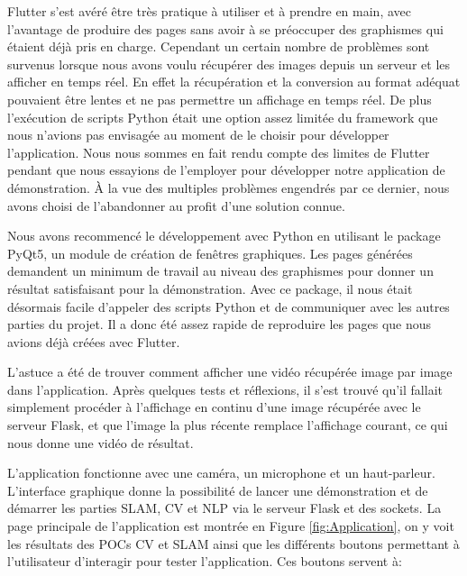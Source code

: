 \documentclass[11pt]{article}
\begin{document}
        Flutter s'est avéré être très pratique à utiliser et à prendre en main, avec l'avantage de produire des pages sans avoir à se préoccuper 
        des graphismes qui étaient déjà pris en charge. Cependant un certain nombre de problèmes sont survenus lorsque nous avons voulu récupérer 
        des images depuis un serveur et les afficher en temps réel. En effet la récupération et la conversion au format adéquat pouvaient être lentes
        et ne pas permettre un affichage en temps réel. De plus l'exécution de scripts Python était une option assez limitée du framework que nous 
        n'avions pas envisagée au moment de le choisir pour développer l'application. Nous nous sommes en fait rendu compte des limites de Flutter 
        pendant que nous essayions de l'employer pour développer notre application de démonstration. À la vue des multiples problèmes engendrés par 
        ce dernier, nous avons choisi de l'abandonner au profit d'une solution connue.

        Nous avons recommencé le développement avec Python en utilisant le package PyQt5, un module de création de fenêtres graphiques. Les pages 
        générées demandent un minimum de travail au niveau des graphismes pour donner un résultat satisfaisant pour la démonstration. Avec ce package, 
        il nous était désormais facile d'appeler des scripts Python et de communiquer avec les autres parties du projet. Il a donc été assez rapide 
        de reproduire les pages que nous avions déjà créées avec Flutter.      
        
        L'astuce a été de trouver comment afficher une vidéo récupérée image par image dans l'application. Après quelques tests et réflexions, 
        il s'est trouvé qu'il fallait simplement procéder à l'affichage en continu d'une image récupérée avec le serveur Flask, et que 
        l'image la plus récente remplace l'affichage courant, ce qui nous donne une vidéo de résultat.

        \pagebreak

        L'application fonctionne avec une caméra, un microphone et un haut-parleur.
        L'interface graphique donne la possibilité de lancer une démonstration et de démarrer les parties SLAM, CV et NLP via le serveur Flask 
        et des sockets. La page principale de l'application est
        montrée en Figure \ref{fig:Application}, on y voit les résultats des POCs CV et SLAM ainsi que les différents boutons permettant
        à l'utilisateur d'interagir pour tester l'application. Ces boutons servent à:
\end{document}
